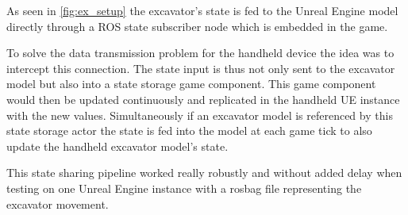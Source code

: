 As seen in \cref{fig:ex_setup} the excavator's state is fed to the Unreal Engine model directly through a ROS state subscriber node which is embedded in the game.

To solve the data transmission problem for the handheld device the idea was to intercept this connection. The state input is thus not only sent to the excavator model but also into a state storage game component. This game component would then be updated continuously and replicated in the handheld UE instance with the new values. Simultaneously if an excavator model is referenced by this state storage actor the state is fed into the model at each game tick to also update the handheld excavator model's state.

This state sharing pipeline worked really robustly and without added delay when testing on one Unreal Engine instance with a rosbag file representing the excavator movement.